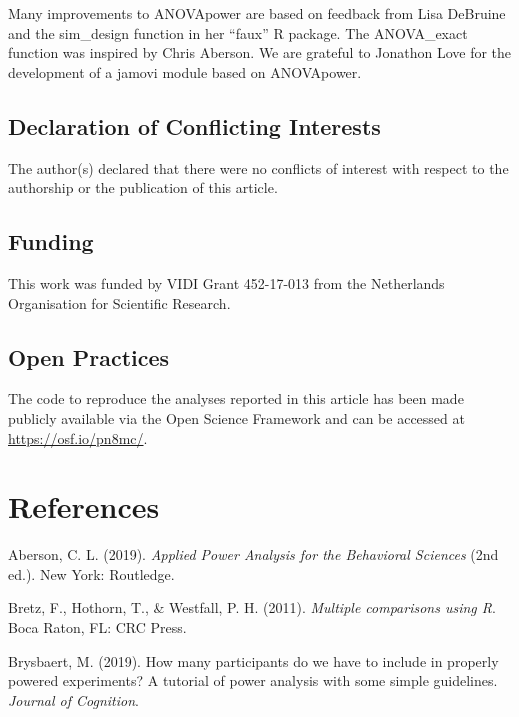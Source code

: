 \documentclass[,jou,floatsintext]{apa6}
\begin{document}
Many improvements to ANOVApower are based on feedback from Lisa DeBruine and the sim\_design function in her \enquote{faux} R package. The ANOVA\_exact function was inspired by Chris Aberson. We are grateful to Jonathon Love for the development of a jamovi module based on ANOVApower.

\hypertarget{declaration-of-conflicting-interests}{%
\subsection{Declaration of Conflicting Interests}\label{declaration-of-conflicting-interests}}

The author(s) declared that there were no conflicts of interest with respect to the authorship or the publication of this article.

\hypertarget{funding}{%
\subsection{Funding}\label{funding}}

This work was funded by VIDI Grant 452-17-013 from the Netherlands Organisation for Scientific Research.

\hypertarget{open-practices}{%
\subsection{Open Practices}\label{open-practices}}

The code to reproduce the analyses reported in this article has been made publicly available via the Open Science Framework and can be accessed at \url{https://osf.io/pn8mc/}.

\hypertarget{references}{%
\section{References}\label{references}}

\setlength{\parindent}{-0.5in}
\setlength{\leftskip}{0.5in}

\hypertarget{refs}{}
\leavevmode\hypertarget{ref-aberson_applied_2019}{}%
Aberson, C. L. (2019). \emph{Applied Power Analysis for the Behavioral Sciences} (2nd ed.). New York: Routledge.

\leavevmode\hypertarget{ref-bretz_multiple_2011}{}%
Bretz, F., Hothorn, T., \& Westfall, P. H. (2011). \emph{Multiple comparisons using R}. Boca Raton, FL: CRC Press.

\leavevmode\hypertarget{ref-brysbaert_how_2019}{}%
Brysbaert, M. (2019). How many participants do we have to include in properly powered experiments? A tutorial of power analysis with some simple guidelines. \emph{Journal of Cognition}.
\end{document}
